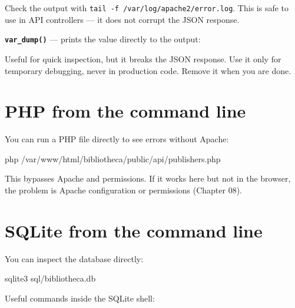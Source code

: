 \documentclass[11pt,a4paper,oneside]{book}
\newenvironment{Shaded}{\begin{snugshade}}{\end{snugshade}}
\newcommand{\OtherTok}[1]{\textcolor[HTML]{007020}{#1}}
\newcommand{\FunctionTok}[1]{\textcolor[HTML]{06287E}{#1}}
\newcommand{\VariableTok}[1]{\textcolor[HTML]{19177C}{#1}}
\newcommand{\ControlFlowTok}[1]{\textcolor[HTML]{007020}{\textbf{#1}}}
\newcommand{\ExtensionTok}[1]{#1}
\newcommand{\NormalTok}[1]{#1}
\begin{document}
Check the output with
\texttt{tail\ -f\ /var/log/apache2/error.log}. This is safe to
use in API controllers --- it does not corrupt the JSON response.

\textbf{\texttt{var\_dump()}} --- prints the value directly to
the output:

\begin{Shaded}
\end{Shaded}

Useful for quick inspection, but it breaks the JSON response. Use
it only for temporary debugging, never in production code. Remove
it when you are done.

\hypertarget{php-from-the-command-line}{%
\section{PHP from the command
line}\label{php-from-the-command-line}}

You can run a PHP file directly to see errors without Apache:

\begin{Shaded}
\begin{Highlighting}[]
\ExtensionTok{php}\NormalTok{ /var/www/html/bibliotheca/public/api/publishers.php}
\end{Highlighting}
\end{Shaded}

This bypasses Apache and permissions. If it works here but not in
the browser, the problem is Apache configuration or permissions
(Chapter 08).

\hypertarget{sqlite-from-the-command-line}{%
\section{SQLite from the command
line}\label{sqlite-from-the-command-line}}

You can inspect the database directly:

\begin{Shaded}
\begin{Highlighting}[]
\ExtensionTok{sqlite3}\NormalTok{ sql/bibliotheca.db}
\end{Highlighting}
\end{Shaded}

Useful commands inside the SQLite shell:
\end{document}
